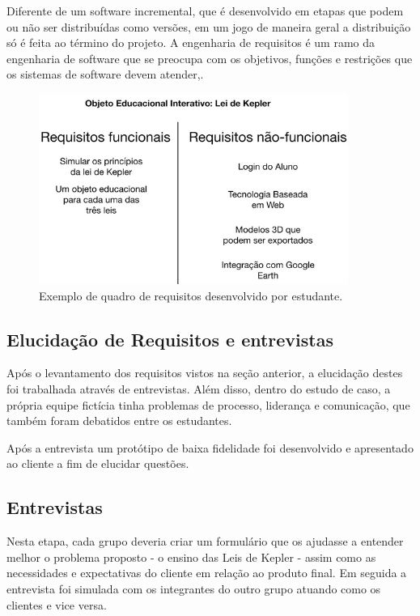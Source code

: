 \documentclass[12pt, onecolumn]{IEEEtran}
\begin{document}
Diferente de um software incremental, que é desenvolvido em etapas que podem ou não ser distribuídas como versões, em um jogo de maneira geral a distribuição só é feita ao término do projeto. A engenharia de requisitos é um ramo da engenharia de software que se preocupa com os objetivos, funções e restrições que os sistemas de software devem atender\cite{b18},\cite{b19}. 



\begin{figure}[H]
    \centering
    \includegraphics[width=0.9\textwidth]{imagens/exemplo-requisitos.png}
    \caption{Exemplo de quadro de requisitos desenvolvido por estudante.}
    \label{fig:mesh1}
\end{figure}

\subsection{Elucidação de Requisitos e entrevistas}

Após o levantamento dos requisitos vistos na seção anterior, a elucidação destes foi trabalhada através de entrevistas. Além disso, dentro do estudo de caso, a própria equipe fictícia tinha problemas de processo, liderança e comunicação, que também foram debatidos entre os estudantes.

Após a entrevista um protótipo de baixa fidelidade foi desenvolvido e apresentado ao cliente a fim de elucidar questões.

\subsection{Entrevistas}

Nesta etapa, cada grupo deveria criar um formulário que os ajudasse a entender melhor o problema proposto - o ensino das Leis de Kepler - assim como as necessidades e expectativas do cliente em relação ao produto final.
Em seguida a entrevista foi simulada com os integrantes do outro grupo atuando como os clientes e vice versa.
\end{document}
